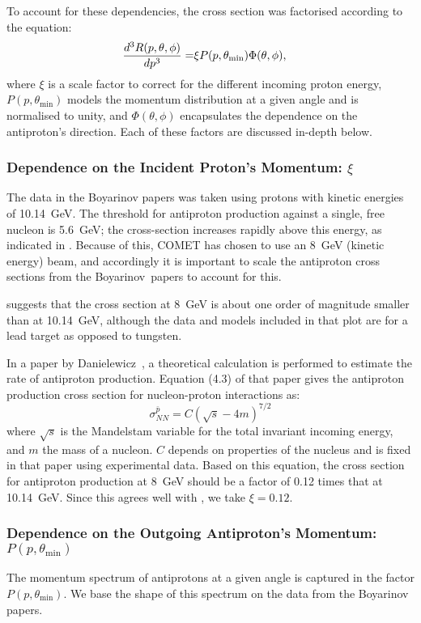 To account for these dependencies, the cross section was factorised according to the equation:
\begin{align}
\eqlabel{bg:antiprotons:factorisation}
	\frac{d^3R(p,\theta,\phi)}{dp^3}=&\xi{}P(p,\theta_\mathrm{min})\Phi(\theta,\phi),
\end{align}
where $\xi$ is a scale factor to correct for the different incoming proton energy, $P(p,\theta_\textrm{min})$ models the momentum distribution at a given angle and is normalised to unity, and $\Phi(\theta,\phi)$ encapsulates the dependence on the antiproton's direction.  Each of these factors are discussed in-depth below.

\subsubsection*{Dependence on the Incident Proton's Momentum: $\xi$}
The data in the Boyarinov papers was taken using protons with kinetic energies of 10.14~GeV.
The threshold for antiproton production against a single, free nucleon is 5.6~GeV; the cross-section increases rapidly above this energy, as indicated in .
Because of this, COMET has chosen to use an 8~GeV (kinetic energy) beam, and accordingly it is important to scale the antiproton cross sections from the Boyarinov~\etal papers to account for this.

 suggests that the cross section at 8~GeV is about one order of magnitude smaller than at 10.14~GeV, although the data and models included in that plot are for a lead target as opposed to tungsten.

In a paper by Danielewicz~\cite{PhysRevC.42.1564}, a theoretical calculation is performed to estimate the rate of antiproton production.
Equation (4.3) of that paper gives the antiproton production cross section for nucleon-proton interactions as:
\begin{equation}
\sigma_{NN}^{\bar{p}}=C(\sqrt{s}-4m)^{7/2}
\end{equation}
where $\sqrt{s}$ is the Mandelstam variable for the total invariant incoming energy, and $m$ the mass of a nucleon.
$C$ depends on properties of the nucleus and is fixed in that paper using experimental data.
Based on this equation, the cross section for antiproton production at 8~GeV should be a factor of 0.12 times that at 10.14~GeV.
Since this agrees well with , we take $\xi=0.12$.

\subsubsection*{Dependence on the Outgoing Antiproton's Momentum: $P(p,\theta_\textrm{min})$}
The momentum spectrum of antiprotons at a given angle is captured in the factor $P(p,\theta_\textrm{min})$.
We base the shape of this spectrum on the data from the Boyarinov papers.

